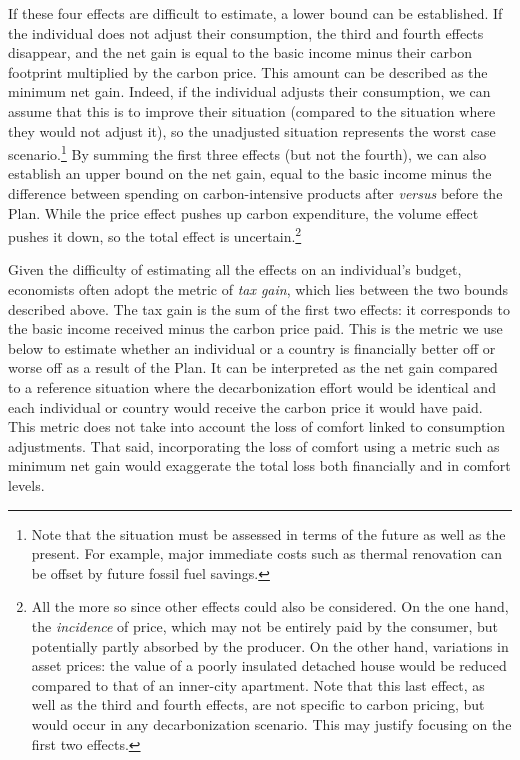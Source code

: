 \documentclass[a5paper,english,openany]{memoir}
\begin{document}
If these four effects are difficult to estimate, a lower bound can be established. If the individual does not adjust their %
consumption, the third and fourth effects disappear, and the net gain is equal to the basic income minus their %
carbon footprint multiplied by the carbon price. This amount can be described as the minimum net gain. Indeed, if the individual adjusts their %
consumption, we can assume that this is to improve their %
situation (compared to the situation where they %
would not adjust it), so the unadjusted situation represents the worst case scenario.\footnote{Note that the situation must be assessed in terms of the future as well as the present. For example, major immediate costs such as thermal renovation can be offset by future fossil fuel savings.} By summing the first three effects (but not the fourth), we can also establish an upper bound on the net gain, equal to the basic income minus the difference between spending on carbon-intensive products after \textit{versus} before the Plan. 
While the price effect pushes up carbon expenditure, the volume effect pushes it down, so the total effect is uncertain.\footnote{All the more so since other effects could also be considered. On the one hand, the \textit{incidence} of price, which may not be entirely paid by the consumer, but potentially partly absorbed by the producer. On the other hand, variations in asset prices: the value of a poorly insulated detached house would be reduced compared to that of an inner-city apartment. Note that this last effect, as well as the third and fourth effects, are not specific to carbon pricing, but would occur in any decarbonization scenario. This may justify focusing on the first two effects.} 

Given the difficulty of estimating all the effects on an individual's budget, economists often adopt the metric of \textit{tax gain}, which lies between the two bounds described above. The tax gain is the sum of the first two effects: it corresponds to the basic income received minus the carbon price paid. This is the metric we use below to estimate whether an individual or a country is financially better off or worse off as a result of the Plan. It can be interpreted as the net gain compared to a reference situation where the decarbonization effort would be identical and each individual or country would receive the carbon price it would have paid. This metric does not take into account the loss of comfort linked to consumption adjustments. That said, incorporating the loss of comfort using a metric such as minimum net gain would exaggerate the total loss both financially and in comfort levels. %
\end{document}
